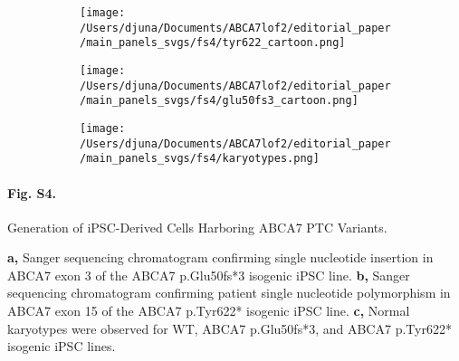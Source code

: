 % 
% 
\begin{figure}[H]
    \begin{subfigure}[t]{0.4\textwidth}
        \caption{}
        \hspace{1.5cm}
        \texttt{[image: /Users/djuna/Documents/ABCA7lof2/editorial\_paper/main\_panels\_svgs/fs4/tyr622\_cartoon.png]}        
    \end{subfigure}  
    \hspace{1.5cm}
    \begin{subfigure}[t]{0.4\textwidth}
        \caption{}
        \texttt{[image: /Users/djuna/Documents/ABCA7lof2/editorial\_paper/main\_panels\_svgs/fs4/glu50fs3\_cartoon.png]}        
    \end{subfigure}  
    \par
    \begin{subfigure}[t]{0.9\textwidth}
        \caption{}
        \hspace{1.5cm}
        \texttt{[image: /Users/djuna/Documents/ABCA7lof2/editorial\_paper/main\_panels\_svgs/fs4/karyotypes.png]}        
    \end{subfigure}  
\end{figure}
\paragraph*{Fig. S4.} Generation of iPSC-Derived Cells Harboring ABCA7 PTC Variants.
{}
\textbf{a,} Sanger sequencing chromatogram confirming single nucleotide insertion in ABCA7 exon 3 of the ABCA7 p.Glu50fs*3 isogenic iPSC line.
\textbf{b,} Sanger sequencing chromatogram confirming patient single nucleotide polymorphism in ABCA7 exon 15 of the ABCA7 p.Tyr622* isogenic iPSC line. 
\textbf{c,} Normal karyotypes were observed for WT, ABCA7 p.Glu50fs*3, and ABCA7 p.Tyr622* isogenic iPSC lines. 
%